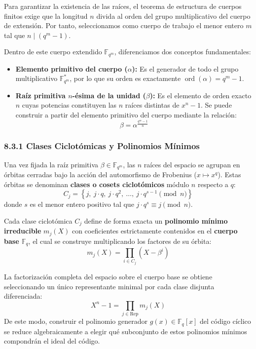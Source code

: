 \documentclass{article}
\begin{document}
Para garantizar la existencia de las raíces, el teorema de estructura de cuerpos finitos exige que la longitud $n$ divida al orden del grupo multiplicativo del cuerpo de extensión. Por tanto, seleccionamos como cuerpo de trabajo el menor entero $m$ tal que $n \mid (q^m - 1)$. 

Dentro de este cuerpo extendido $\mathbb{F}_{q^m}$, diferenciamos dos conceptos fundamentales:
\begin{itemize}
    \item \textbf{Elemento primitivo del cuerpo ($\alpha$):} Es el generador de todo el grupo multiplicativo $\mathbb{F}_{q^m}^*$, por lo que su orden es exactamente $\operatorname{ord}(\alpha) = q^m - 1$.
    \item \textbf{Raíz primitiva $n$-ésima de la unidad ($\beta$):} Es el elemento de orden exacto $n$ cuyas potencias constituyen las $n$ raíces distintas de $x^n - 1$. Se puede construir a partir del elemento primitivo del cuerpo mediante la relación:
    \[
    \beta = \alpha^{\frac{q^m - 1}{n}}
    \]
\end{itemize}

\subsubsection{8.3.1 Clases Ciclotómicas y Polinomios Mínimos}

Una vez fijada la raíz primitiva $\beta \in \mathbb{F}_{q^m}$, las $n$ raíces del espacio se agrupan en órbitas cerradas bajo la acción del automorfismo de Frobenius ($x \mapsto x^q$). Estas órbitas se denominan \textbf{clases o cosets ciclotómicos} módulo $n$ respecto a $q$:
\[
C_j = \left\{ j, \ j\cdot q, \ j\cdot q^2, \ \dots, \ j\cdot q^{s-1} \pmod n \right\}
\]
donde $s$ es el menor entero positivo tal que $j\cdot q^s \equiv j \pmod n$. 

Cada clase ciclotómica $C_j$ define de forma exacta un \textbf{polinomio mínimo irreducible} $m_j(X)$ con coeficientes estrictamente contenidos en el \textbf{cuerpo base $\mathbb{F}_q$}, el cual se construye multiplicando los factores de su órbita:
\[
m_j(X) = \prod_{i \in C_j} (X - \beta^i)
\]

La factorización completa del espacio sobre el cuerpo base se obtiene seleccionando un único representante minimal por cada clase disjunta diferenciada: 
\[
X^n - 1 = \prod_{j \in \text{Rep}} m_j(X)
\]
De este modo, construir el polinomio generador $g(x) \in \mathbb{F}_q[x]$ del código cíclico se reduce algebraicamente a elegir qué subconjunto de estos polinomios mínimos compondrán el ideal del código.
\end{document}
